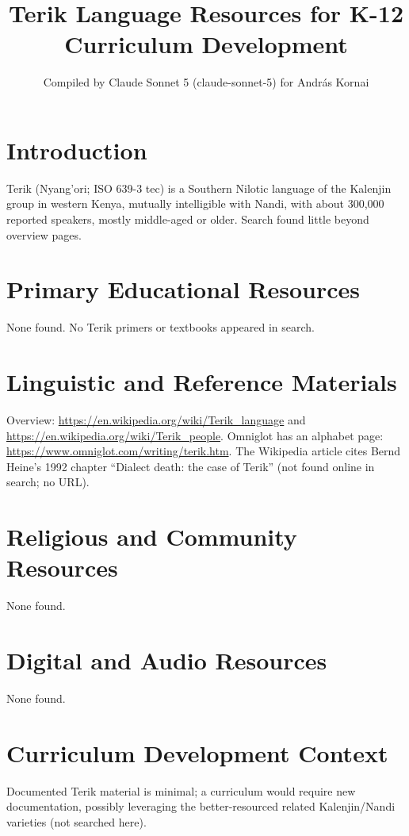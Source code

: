 \documentclass[12pt]{article}
\title{Terik Language Resources for K-12 Curriculum Development}
\author{Compiled by Claude Sonnet 5 (claude-sonnet-5) for Andr\'as Kornai}
\date{}
\begin{document}
\maketitle
\section{Introduction}
Terik (Nyang'ori; ISO 639-3 tec) is a Southern Nilotic language of the Kalenjin group in western Kenya, mutually intelligible with Nandi, with about 300,000 reported speakers, mostly middle-aged or older. Search found little beyond overview pages.
\section{Primary Educational Resources}
None found. No Terik primers or textbooks appeared in search.
\section{Linguistic and Reference Materials}
Overview: \url{https://en.wikipedia.org/wiki/Terik_language} and \url{https://en.wikipedia.org/wiki/Terik_people}. Omniglot has an alphabet page: \url{https://www.omniglot.com/writing/terik.htm}. The Wikipedia article cites Bernd Heine's 1992 chapter ``Dialect death: the case of Terik'' (not found online in search; no URL).
\section{Religious and Community Resources}
None found.
\section{Digital and Audio Resources}
None found.
\section{Curriculum Development Context}
Documented Terik material is minimal; a curriculum would require new documentation, possibly leveraging the better-resourced related Kalenjin/Nandi varieties (not searched here).
\end{document}
